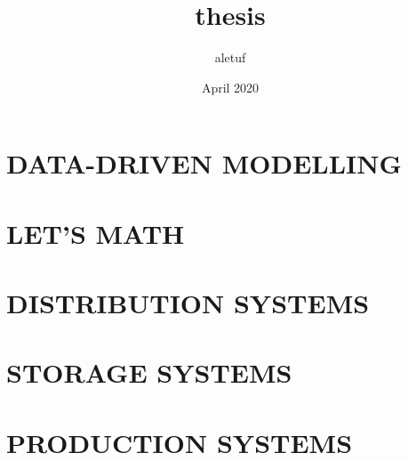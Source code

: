 \documentclass{book}
\title{thesis}
\author{aletuf }
\date{April 2020}
\begin{document}
\frontmatter


%
%
%
%


\tableofcontents






\mainmatter

\part{DATA-DRIVEN MODELLING}





\part{LET'S MATH}












\part{DISTRIBUTION SYSTEMS}
%
%
%


\part{STORAGE SYSTEMS}





\part{PRODUCTION SYSTEMS}
%
%
%
%
\end{document}
